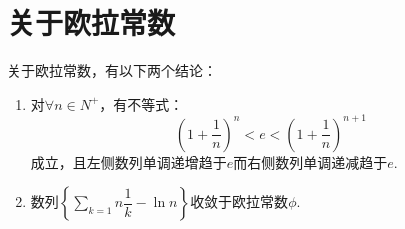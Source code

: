 \section{关于欧拉常数}

\begin{proposition}
	关于欧拉常数，有以下两个结论：
	\begin{enumerate}
		\item 对$\forall n\in N^+$，有不等式：
		\begin{equation}
			(1+\dfrac{1}{n})^n<e<(1+\dfrac{1}{n})^{n+1}
		\end{equation}
		成立，且左侧数列单调递增趋于$e$而右侧数列单调递减趋于$e$.
		\item 数列$\left\{\displaystyle\sum_{k=1}{n}\dfrac{1}{k}-\ln{n}\right\}$收敛于欧拉常数$\phi$.
	\end{enumerate}
\end{proposition}